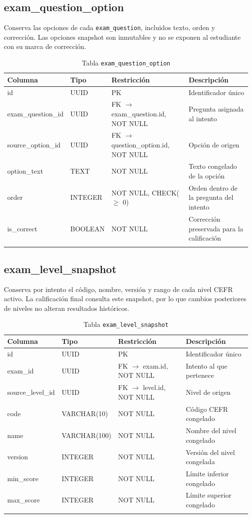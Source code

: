 \subsection{exam\_question\_option}

Conserva las opciones de cada \texttt{exam\_question}, incluidos texto, orden y corrección. Las opciones snapshot son inmutables y no se exponen al estudiante con su marca de corrección.

\begin{longtable}{l l l p{5cm}}
\toprule
\textbf{Columna} & \textbf{Tipo} & \textbf{Restricción} & \textbf{Descripción} \\
\midrule
\endhead
id & UUID & PK & Identificador único \\
exam\_question\_id & UUID & FK $\rightarrow$ exam\_question.id, NOT NULL & Pregunta asignada al intento \\
source\_option\_id & UUID & FK $\rightarrow$ question\_option.id, NOT NULL & Opción de origen \\
option\_text & TEXT & NOT NULL & Texto congelado de la opción \\
order & INTEGER & NOT NULL, CHECK($\ge$ 0) & Orden dentro de la pregunta del intento \\
is\_correct & BOOLEAN & NOT NULL & Corrección preservada para la calificación \\
\bottomrule
\caption{Tabla \texttt{exam\_question\_option}}
\end{longtable}

\subsection{exam\_level\_snapshot}

Conserva por intento el código, nombre, versión y rango de cada nivel CEFR activo. La calificación final consulta este snapshot, por lo que cambios posteriores de niveles no alteran resultados históricos.

\begin{longtable}{l l l p{5cm}}
\toprule
\textbf{Columna} & \textbf{Tipo} & \textbf{Restricción} & \textbf{Descripción} \\
\midrule
\endhead
id & UUID & PK & Identificador único \\
exam\_id & UUID & FK $\rightarrow$ exam.id, NOT NULL & Intento al que pertenece \\
source\_level\_id & UUID & FK $\rightarrow$ level.id, NOT NULL & Nivel de origen \\
code & VARCHAR(10) & NOT NULL & Código CEFR congelado \\
name & VARCHAR(100) & NOT NULL & Nombre del nivel congelado \\
version & INTEGER & NOT NULL & Versión del nivel congelada \\
min\_score & INTEGER & NOT NULL & Límite inferior congelado \\
max\_score & INTEGER & NOT NULL & Límite superior congelado \\
\bottomrule
\caption{Tabla \texttt{exam\_level\_snapshot}}
\end{longtable}

